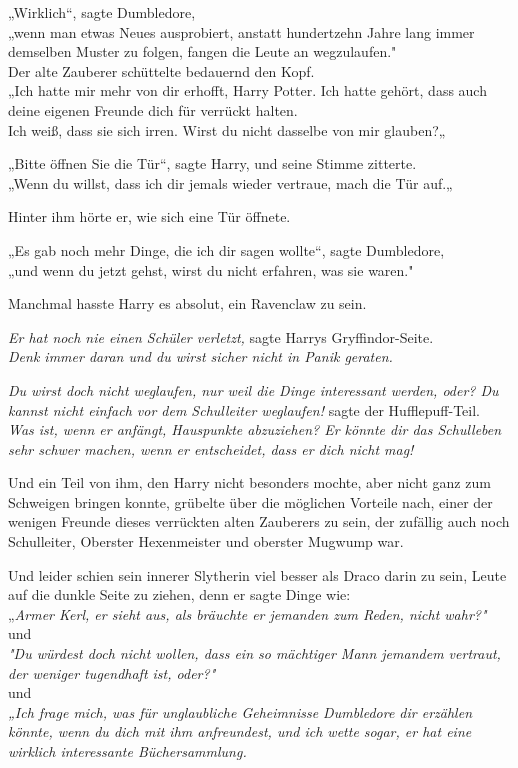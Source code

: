 {„Wirklich“, sagte Dumbledore,\\ „wenn man etwas Neues ausprobiert, anstatt hundertzehn Jahre lang immer demselben Muster zu folgen, fangen die Leute an wegzulaufen."\\ Der alte Zauberer schüttelte bedauernd den Kopf.\\ „Ich hatte mir mehr von dir erhofft, Harry Potter. Ich hatte gehört, dass auch deine eigenen Freunde dich für verrückt halten.\\ Ich weiß, dass sie sich irren. Wirst du nicht dasselbe von mir glauben?„

„Bitte öffnen Sie die Tür“, sagte Harry, und seine Stimme zitterte.\\ „Wenn du willst, dass ich dir jemals wieder vertraue, mach die Tür auf.„

Hinter ihm hörte er, wie sich eine Tür öffnete.

„Es gab noch mehr Dinge, die ich dir sagen wollte“, sagte Dumbledore,\\ „und wenn du jetzt gehst, wirst du nicht erfahren, was sie waren."

Manchmal hasste Harry es absolut, ein Ravenclaw zu sein.

\emph{Er hat noch nie einen Schüler verletzt,} sagte Harrys Gryffindor-Seite.\\ \emph{Denk immer daran und du wirst sicher nicht in Panik geraten.}

\emph{Du wirst doch nicht weglaufen, nur weil die Dinge interessant werden, oder? Du kannst nicht einfach vor dem Schulleiter weglaufen!} sagte der Hufflepuff-Teil.\\ \emph{Was ist, wenn er anfängt, Hauspunkte abzuziehen? Er könnte dir das Schulleben sehr schwer machen, wenn er entscheidet, dass er dich nicht mag!}

Und ein Teil von ihm, den Harry nicht besonders mochte, aber nicht ganz zum Schweigen bringen konnte, grübelte über die möglichen Vorteile nach, einer der wenigen Freunde dieses verrückten alten Zauberers zu sein, der zufällig auch noch Schulleiter, Oberster Hexenmeister und oberster Mugwump war.

Und leider schien sein innerer Slytherin viel besser als Draco darin zu sein, Leute auf die dunkle Seite zu ziehen, denn er sagte Dinge wie:\\ „\emph{Armer Kerl, er sieht aus, als bräuchte er jemanden zum Reden, nicht wahr?"}\\ und\\ \emph{"Du würdest doch nicht wollen, dass ein so mächtiger Mann jemandem vertraut, der weniger tugendhaft ist, oder?"}\\ und\\ \emph{„Ich frage mich, was für unglaubliche Geheimnisse Dumbledore dir erzählen könnte, wenn du dich mit ihm anfreundest, und ich wette sogar, er hat eine wirklich interessante Büchersammlung.}

}
